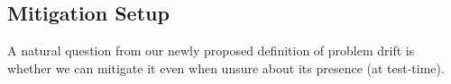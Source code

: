 
\subsection{Mitigation Setup}
A natural question from our newly proposed definition of problem drift is whether we can mitigate it even when unsure about its presence (at test-time).

